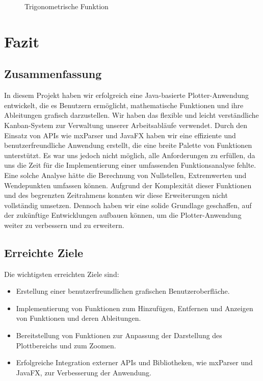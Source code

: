 \documentclass[a4paper]{article}
\begin{document}
\begin{enumerate}
\begin{figure}[ht]
		      \caption{Trigonometrische Funktion}
		      \label{fig:example_trigonometric}
	      \end{figure}
\end{enumerate}

\newpage

\section{Fazit}

\subsection{Zusammenfassung}
In diesem Projekt haben wir erfolgreich eine Java-basierte Plotter-Anwendung entwickelt, die es Benutzern ermöglicht, mathematische Funktionen und ihre Ableitungen grafisch darzustellen. Wir haben das flexible und leicht verständliche Kanban-System zur Verwaltung unserer Arbeitsabläufe verwendet. Durch den Einsatz von APIs wie mxParser und JavaFX haben wir eine effiziente und benutzerfreundliche Anwendung erstellt, die eine breite Palette von Funktionen unterstützt.
Es war uns jedoch nicht möglich, alle Anforderungen zu erfüllen, da uns die Zeit für die Implementierung einer umfassenden Funktionsanalyse fehlte. Eine solche Analyse hätte die Berechnung von Nullstellen, Extremwerten und Wendepunkten umfassen können. Aufgrund der Komplexität dieser Funktionen und des begrenzten Zeitrahmens konnten wir diese Erweiterungen nicht vollständig umsetzen. Dennoch haben wir eine solide Grundlage geschaffen, auf der zukünftige Entwicklungen aufbauen können, um die Plotter-Anwendung weiter zu verbessern und zu erweitern.

\subsection{Erreichte Ziele}
Die wichtigsten erreichten Ziele sind:
\begin{itemize}
	\item Erstellung einer benutzerfreundlichen grafischen Benutzeroberfläche.
	\item Implementierung von Funktionen zum Hinzufügen, Entfernen und Anzeigen von Funktionen und deren Ableitungen.
	\item Bereitstellung von Funktionen zur Anpassung der Darstellung des Plottbereichs und zum Zoomen.
	\item Erfolgreiche Integration externer APIs und Bibliotheken, wie mxParser und JavaFX, zur Verbesserung der Anwendung.
\end{itemize}
\end{document}
